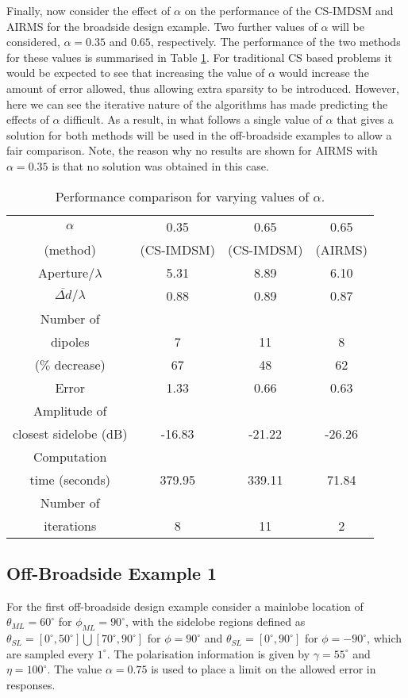 \documentclass[10pt,final]{IEEEtran}
\begin{document}
Finally, now consider the effect of $\alpha$ on the performance of the CS-IMDSM and AIRMS for the broadside design example.  Two further values of $\alpha$ will be considered, $\alpha=0.35$ and $0.65$, respectively.  The performance of the two methods for these values is summarised in Table \ref{tb:broadalpha}.  For traditional CS based problems it would be expected to see that increasing the value of $\alpha$ would increase the amount of error allowed, thus allowing extra sparsity to be introduced.  However, here we can see the iterative nature of the algorithms has made predicting the effects of $\alpha$ difficult.  As a result, in what follows a single value of $\alpha$ that gives a solution for both methods will be used in the off-broadside examples to allow a fair comparison.  Note, the reason why no results are shown for AIRMS with $\alpha=0.35$ is that no solution was obtained in this case.


\begin{table}
\caption{\rm Performance comparison for varying values of $\alpha$.} \centering
\begin{tabular}{|c|c|c|c|}
  \hline
  $\alpha$  & 0.35  & 0.65  & 0.65   \\
   (method) &  (CS-IMDSM) &  (CS-IMDSM) &  (AIRMS)  \\
  \hline
  Aperture/$\lambda$ & 5.31 & 8.89 & 6.10 \\
  $\overline{\Delta{d}}/\lambda$ & 0.88 & 0.89 & 0.87\\
  \hline
  Number of &  &  &  \\
  dipoles & 7 & 11 & 8 \\
  ($\%$ decrease) &67  & 48 & 62 \\
  \hline
  Error & 1.33 & 0.66 & 0.63\\
  \hline
  Amplitude of &  &  &  \\
  closest sidelobe (dB)& -16.83 & -21.22 & -26.26 \\
  \hline
  Computation &  &  &  \\
  time (seconds) & 379.95 & 339.11 & 71.84 \\
  \hline
  Number of &  &  &  \\
  iterations & 8 & 11 & 2 \\
  \hline
\end{tabular}
\label{tb:broadalpha}
\end{table}

\subsection{Off-Broadside Example 1}
For the first off-broadside design example consider a mainlobe location of $\theta_{ML}=60^{\circ}$ for $\phi_{ML}=90^{\circ}$, with the sidelobe regions defined as $\theta_{SL}=[0^{\circ},50^{\circ}]\bigcup[70^{\circ},90^{\circ}]$ for $\phi=90^{\circ}$ and $\theta_{SL}=[0^{\circ},90^{\circ}]$ for $\phi=-90^{\circ}$, which are sampled every $1^{\circ}$.  The polarisation information is given by $\gamma=55^{\circ}$ and $\eta=100^{\circ}$.  The value $\alpha=0.75$ is used to place a limit on the allowed error in responses.
\end{document}
